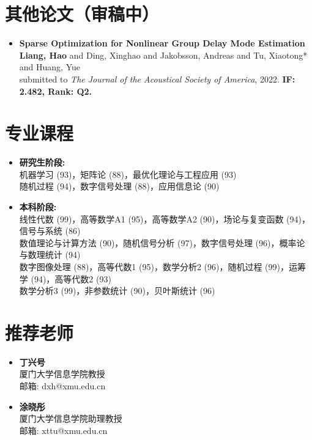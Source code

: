\documentclass[11pt,a4paper,roman]{moderncv}        %
\begin{document}
	\section{其他论文（审稿中）}
	
	\begin{itemize}
		\item \textbf{Sparse Optimization for Nonlinear Group Delay Mode Estimation} \\
		\textbf{Liang, Hao} and Ding, Xinghao and Jakobsson, Andreas and Tu, Xiaotong* and Huang, Yue \\
		submitted to \emph{The Journal of the Acoustical Society of America}, 2022. \textbf{IF: 2.482, Rank: Q2.} 
	\end{itemize}
	
	
	
	\section{专业课程}
	
	\begin{itemize}
		\item \textbf{研究生阶段:} \vspace*{0.75mm} \\
		机器学习 (93)，矩阵论 (88)，最优化理论与工程应用 (93) \\
		随机过程 (94)，数字信号处理 (88)，应用信息论 (90)
		\vspace*{1.75mm}
		\item \textbf{本科阶段:} \vspace*{0.75mm} \\
		线性代数 (99)，高等数学A1 (95)，高等数学A2 (90)，场论与复变函数 (94)，信号与系统 (86)\\
		数值理论与计算方法 (90)，随机信号分析 (97)，数字信号处理 (96)，概率论与数理统计 (94)\\
		数字图像处理 (88)，高等代数1 (95)，数学分析2 (96)，随机过程 (99)，运筹学 (94)，高等代数2 (93)\\
		数学分析3 (99)，非参数统计 (90)，贝叶斯统计 (96)
 	\end{itemize}
	
	\section{推荐老师}
	
	\vspace*{-3.5mm}
	
	\begin{multicols}{2}
		\begin{itemize}
			\item \textbf{丁兴号}\\
			厦门大学信息学院教授 \\
			邮箱: dxh@xmu.edu.cn
		\end{itemize}
		
		\begin{itemize}
			\item \textbf{涂晓彤}\\
			厦门大学信息学院助理教授\\
			邮箱: xttu@xmu.edu.cn
		\end{itemize}
	\end{multicols}
	
\end{document}
